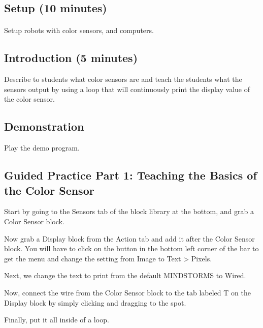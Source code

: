 \documentclass{lessonplan}
\begin{document}
    \subsection{Setup (10 minutes)}
      \paragraph{}
      Setup robots with color sensors, and computers.
    \subsection{Introduction (5 minutes)}
      Describe to students what color sensors are and teach the students what the sensors output by using a loop that will continuously print the display value of the color sensor. 
    \subsection{Demonstration}
      Play the demo program.
    \subsection{Guided Practice Part 1: Teaching the Basics of the Color Sensor}
    
        Start by going to the Sensors tab of the block library at the bottom, and grab a Color Sensor block.

      
        Now grab a Display block from the Action tab and add it after the Color Sensor block. You will have to click on the button in the bottom left corner of the bar to get the menu and change the setting from Image to Text > Pixels.
      
      
        Next, we change the text to print from the default MINDSTORMS to Wired.
        

        Now, connect the wire from the Color Sensor block to the tab labeled T on the Display block by simply clicking and dragging to the spot.
        
        
        Finally, put it all inside of a loop.
        
        
\end{document}
